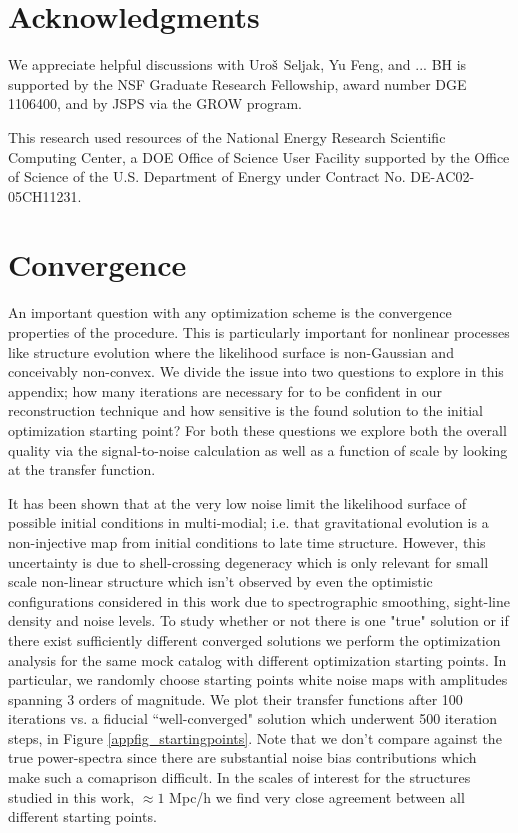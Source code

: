 \documentclass[usenatbib,onecolumn]{mnras}
\begin{document}
\section*{Acknowledgments}
We appreciate helpful discussions with Uro${\rm \check{s}}$ Seljak, Yu Feng, and ... 
BH is supported by the NSF Graduate Research Fellowship, award number DGE 1106400, and by JSPS via the GROW program.

This research used resources of the National Energy Research Scientific Computing Center, a DOE Office of Science User Facility supported by the Office of Science of the U.S. Department of Energy under Contract No. DE-AC02-05CH11231.

\appendix


\section{Convergence}

An important question with any optimization scheme is the convergence properties of the procedure. This is particularly important for nonlinear processes like structure evolution where the likelihood surface is non-Gaussian and conceivably non-convex. We divide the issue into two questions to explore in this appendix; how many iterations are necessary for to be confident in our reconstruction technique and how sensitive is the found solution to the initial optimization starting point? For both these questions we explore both the overall quality via the signal-to-noise calculation \cite{2014LeeObserving} as well as a function of scale by looking at the transfer function.
 
It has been shown that at the very low noise limit the likelihood surface of possible initial conditions in multi-modial; i.e. that gravitational evolution is a non-injective map from initial conditions to late time structure.\cite{2018fengseljakzaldarriaga} However, this uncertainty is due to shell-crossing degeneracy which is only relevant for small scale non-linear structure which isn't observed by even the optimistic configurations considered in this work due to spectrographic smoothing, sight-line density and noise levels. To study whether or not there is one "true" solution or if there exist sufficiently different converged solutions we perform the optimization analysis for the same mock catalog with different optimization starting points. In particular, we randomly choose starting points white noise maps with amplitudes spanning 3 orders of magnitude. We plot their transfer functions after 100 iterations vs. a fiducial ``well-converged" solution which underwent 500 iteration steps, in Figure \ref{appfig_startingpoints}. Note that we don't compare against the true power-spectra since there are substantial noise bias contributions which make such a comaprison difficult. In the scales of interest for the structures studied in this work, $\approx 1$ Mpc/h we find very close agreement between all different starting points. 
\end{document}
